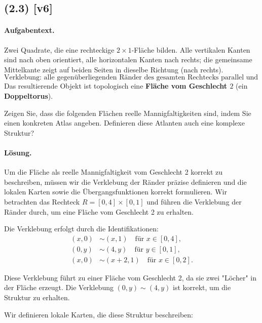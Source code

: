 \documentclass[11pt,a4paper]{article}
\begin{document}

\subsection*{(2.3) [v6]}
\paragraph{Aufgabentext.}
Zwei Quadrate, die eine rechteckige $2\times1$-Fläche bilden.  
Alle vertikalen Kanten sind nach oben orientiert, 
alle horizontalen Kanten nach rechts; 
die gemeinsame Mittelkante zeigt auf beiden Seiten in dieselbe Richtung (nach rechts).  
\[
\text{Verklebung: alle gegenüberliegenden Ränder des gesamten Rechtecks parallel und gleich orientiert.}
\]
Das resultierende Objekt ist topologisch eine \textbf{Fläche vom Geschlecht $2$} (ein \textbf{Doppeltorus}).

Zeigen Sie, dass die folgenden Flächen reelle Mannigfaltigkeiten sind, indem Sie einen konkreten Atlas angeben. Definieren diese Atlanten auch eine komplexe Struktur?

\paragraph{Lösung.}
Um die Fläche als reelle Mannigfaltigkeit vom Geschlecht 2 korrekt zu beschreiben, müssen wir die Verklebung der Ränder präzise definieren und die lokalen Karten sowie die Übergangsfunktionen korrekt formulieren. Wir betrachten das Rechteck $R = [0, 4] \times [0, 1]$ und führen die Verklebung der Ränder durch, um eine Fläche vom Geschlecht 2 zu erhalten.

Die Verklebung erfolgt durch die Identifikationen:
\begin{align*}
(x, 0) &\sim (x, 1) \quad \text{für } x \in [0, 4], \\
(0, y) &\sim (4, y) \quad \text{für } y \in [0, 1], \\
(x, 0) &\sim (x+2, 1) \quad \text{für } x \in [0, 2].
\end{align*}

Diese Verklebung führt zu einer Fläche vom Geschlecht 2, da sie zwei "Löcher" in der Fläche erzeugt. Die Verklebung $(0, y) \sim (4, y)$ ist korrekt, um die Struktur zu erhalten.

Wir definieren lokale Karten, die diese Struktur beschreiben:
\end{document}
